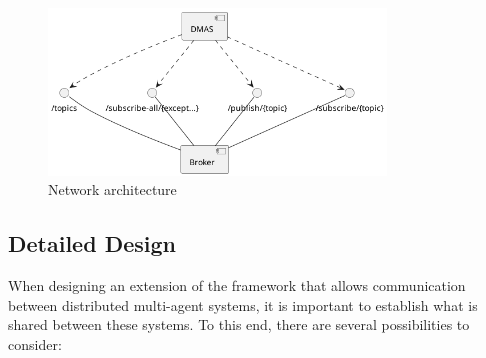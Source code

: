 \begin{figure}[ht!]
    \centering
    \includegraphics[width=0.8\textwidth]{figures/network-architecture.png}
    \caption{Network architecture}
    \label{fig:network-architecture}
\end{figure}

\subsection{Detailed Design}
When designing an extension of the framework that allows communication between distributed multi-agent systems, it is important to establish what is shared between these systems.
To this end, there are several possibilities to consider:

%

